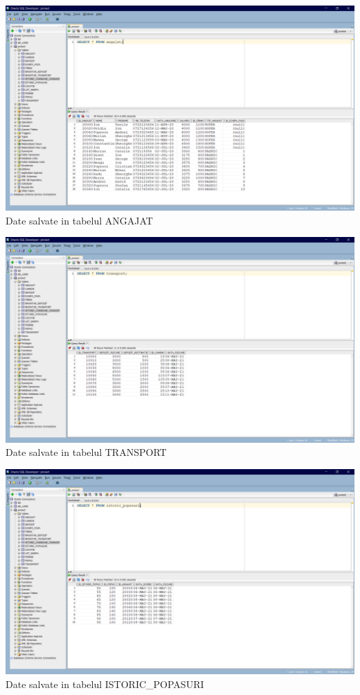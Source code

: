 \documentclass[12pt, a4paper]{article}
\begin{document}
\includegraphics[width=\textwidth]{date_tabel_ang.png}
\label{date_tabel_ang}
\centering Date salvate in tabelul ANGAJAT

\includegraphics[width=\textwidth]{date_tabel_trans.png}
\label{date_tabel_trans}
\centering Date salvate in tabelul TRANSPORT

\includegraphics[width=\textwidth]{date_tabel_ist_pop.png}
\label{date_tabel_ist_pop}
\centering Date salvate in tabelul ISTORIC\_POPASURI
\end{document}

